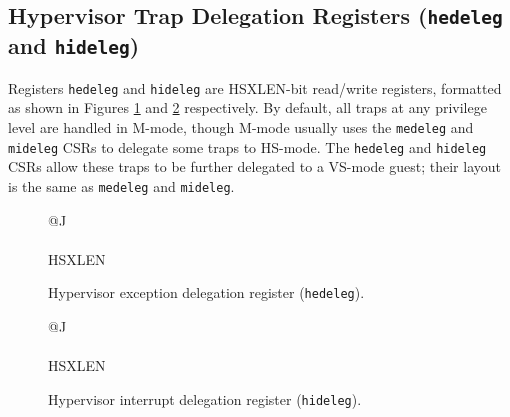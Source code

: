 \subsection{Hypervisor Trap Delegation Registers ({\tt hedeleg} and {\tt hideleg})}

Registers {\tt hedeleg} and {\tt hideleg} are HSXLEN-bit read/write
registers, formatted as shown in Figures \ref{hedelegreg} and
\ref{hidelegreg} respectively.
By default, all traps at any privilege level are handled in M-mode, though
M-mode usually uses the {\tt medeleg} and {\tt mideleg} CSRs to delegate
some traps to HS-mode.  The {\tt hedeleg} and {\tt hideleg} CSRs allow these
traps to be further delegated to a VS-mode guest; their layout is the same
as {\tt medeleg} and {\tt mideleg}.

\begin{figure}[h!]
{\footnotesize
\begin{center}
\begin{tabular}{@{}J}
 \\
\hline
{} \\
\hline
HSXLEN \\
\end{tabular}
\end{center}
}
\vspace{-0.1in}
\caption{Hypervisor exception delegation register ({\tt hedeleg}).}
\label{hedelegreg}
\end{figure}

\begin{figure}[h!]
{\footnotesize
\begin{center}
\begin{tabular}{@{}J}
 \\
\hline
{} \\
\hline
HSXLEN \\
\end{tabular}
\end{center}
}
\vspace{-0.1in}
\caption{Hypervisor interrupt delegation register ({\tt hideleg}).}
\label{hidelegreg}
\end{figure}

